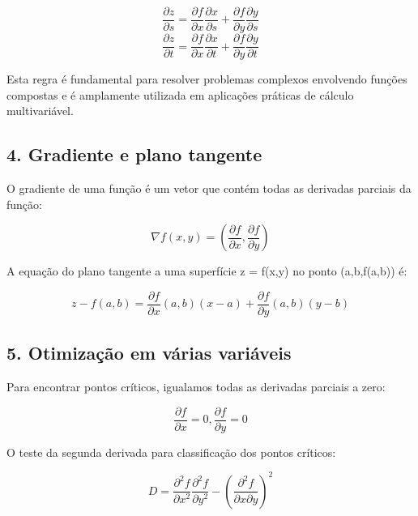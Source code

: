 \documentclass{article}
\begin{document}
$$ \frac{\partial z}{\partial s} = \frac{\partial f}{\partial x} \frac{\partial x}{\partial s} + \frac{\partial f}{\partial y} \frac{\partial y}{\partial s} $$
$$ \frac{\partial z}{\partial t} = \frac{\partial f}{\partial x} \frac{\partial x}{\partial t} + \frac{\partial f}{\partial y} \frac{\partial y}{\partial t} $$

Esta regra é fundamental para resolver problemas complexos envolvendo funções compostas e é amplamente utilizada em aplicações práticas de cálculo multivariável.


\subsection*{4. Gradiente e plano tangente}

O gradiente de uma função é um vetor que contém todas as derivadas parciais da função:

$$ \nabla f(x,y) = \left(\frac{\partial f}{\partial x}, \frac{\partial f}{\partial y}\right) $$

A equação do plano tangente a uma superfície z = f(x,y) no ponto (a,b,f(a,b)) é:

$$ z - f(a,b) = \frac{\partial f}{\partial x}(a,b)(x-a) + \frac{\partial f}{\partial y}(a,b)(y-b) $$

\subsection*{5. Otimização em várias variáveis}

Para encontrar pontos críticos, igualamos todas as derivadas parciais a zero:

$$ \frac{\partial f}{\partial x} = 0, \frac{\partial f}{\partial y} = 0 $$

O teste da segunda derivada para classificação dos pontos críticos:

$$ D = \frac{\partial^2 f}{\partial x^2} \frac{\partial^2 f}{\partial y^2} - \left(\frac{\partial^2 f}{\partial x \partial y}\right)^2 $$


\end{document}
